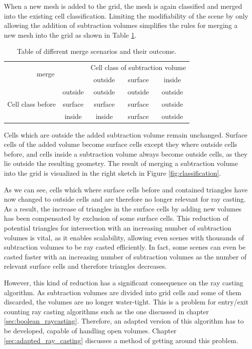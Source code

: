 When a new mesh is added to the grid, the mesh is again classified and merged into the existing cell classification. Limiting the modifiability of the scene by only allowing the addition of subtraction volumes simplifies the rules for merging a new mesh into the grid as shown in Table \ref{tbl:classification_rules}.

\begin{table}[h]
	\centering
	\begin{tabular}{|c|c|c|c|c|}
		\hline
		\multicolumn{2}{|c|}{\multirow{2}{*}{merge}} & \multicolumn{3}{c|}{Cell class of subtraction volume} \\
		\cline{3-5}
		\multicolumn{2}{|c|}{} & outside & surface & inside \\
		\hline
		\multirow{3}{*}{Cell class before} & outside & outside & outside & outside \\
		\cline{2-5}
		& surface & surface & surface & outside \\
		\cline{2-5}
		& inside & inside & surface & outside \\
		\hline
	\end{tabular}
	\caption{Table of different merge scenarios and their outcome.}
	\label{tbl:classification_rules}
\end{table}

Cells which are outside the added subtraction volume remain unchanged. Surface cells of the added volume become surface cells except they where outside cells before, and cells inside a subtraction volume always become outside cells, as they lie outside the resulting geometry. The result of merging a subtraction volume into the grid is visualized in the right sketch in Figure \ref{fig:classification}.

As we can see, cells which where surface cells before and contained triangles have now changed to outside cells and are therefore no longer relevant for ray casting. As a result, the increase of triangles in the surface cells by adding new volumes has been compensated by exclusion of some surface cells. This reduction of potential triangles for intersection with an increasing number of subtraction volumes is vital, as it enables scalability, allowing even scenes with thousands of subtraction volumes to be ray casted efficiently. In fact, some scenes can even be casted faster with an increasing number of subtraction volumes as the number of relevant surface cells and therefore triangles decreases.

However, this kind of reduction has a significant consequence on the ray casting algorithm. As subtraction volumes are divided into grid cells and some of them discarded, the volumes are no longer water-tight. This is a problem for entry/exit counting ray casting algorithms such as the one discussed in chapter \ref{sec:boolean_raycasting}. Therefore, an adapted version of this algorithm has to be developed, capable of handling open volumes. Chapter \ref{sec:adapted_ray_casting} discusses a method of getting around this problem.

